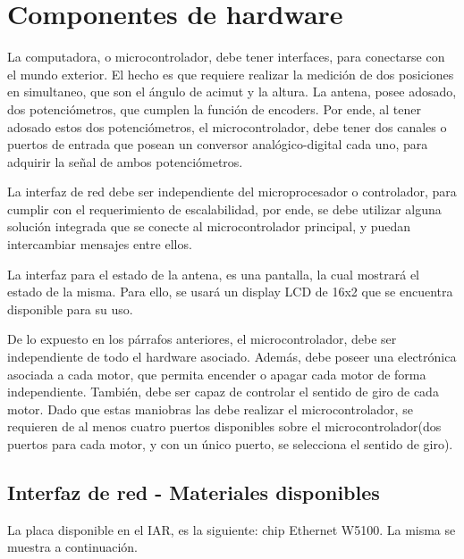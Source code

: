 \section{Componentes de hardware} \label{Sec_CompH}


La computadora, o microcontrolador, debe tener interfaces, para conectarse con el mundo exterior. El hecho es que requiere realizar la medición de dos posiciones en simultaneo, que son el ángulo de acimut y la altura. La antena, posee adosado, dos potenciómetros, que cumplen la función de encoders. Por ende, al tener adosado estos dos potenciómetros, el microcontrolador, debe tener dos canales o puertos de entrada que posean un conversor analógico-digital cada uno, para adquirir la señal de ambos potenciómetros.  

La interfaz de red debe ser independiente del microprocesador o controlador, para cumplir con el requerimiento de escalabilidad, por ende, se debe utilizar alguna solución integrada que se conecte al microcontrolador principal, y puedan intercambiar mensajes entre ellos. 

La interfaz para el estado de la antena, es una pantalla, la cual mostrará el estado de la misma. Para ello, se usará un display LCD de 16x2 que se encuentra disponible para su uso.


De lo expuesto en los párrafos anteriores, el microcontrolador, debe ser independiente de todo el hardware asociado. Además, debe poseer una electrónica asociada a cada motor, que permita encender o apagar cada motor de forma independiente. También, debe ser capaz de controlar el sentido de giro de cada motor. Dado que estas maniobras las debe realizar el microcontrolador, se requieren de al menos cuatro puertos disponibles sobre el microcontrolador(dos puertos para cada motor, y con un único puerto, se selecciona el sentido de giro). 


\subsection{Interfaz de red - Materiales disponibles}\label{Int_r} 

La placa disponible en el IAR, es la siguiente: chip Ethernet W5100. La misma se muestra a continuación. 

